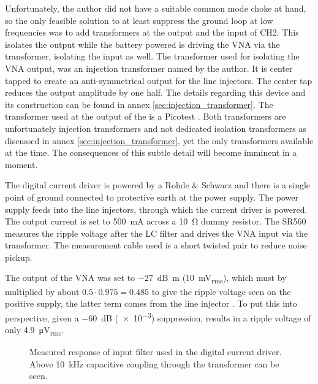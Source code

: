 Unfortunately, the author did not have a suitable common mode choke at hand, so the only feasible solution to at least suppress the ground loop at low frequencies was to add transformers at the output and the input of CH2. This isolates the output while the battery powered  is driving the VNA via the transformer, isolating the input as well. The transformer used for isolating the VNA output, was an injection transformer named  by the author. It is center tapped to create an anti-symmetrical output for the line injectors. The center tap reduces the output amplitude by one half. The details regarding this device and its construction can be found in annex \ref{sec:injection_transformer}. The transformer used at the output of the  is a Picotest . Both transformers are unfortunately injection transformers and not dedicated isolation transformers as discussed in annex \ref{sec:injection_transformer}, yet the only transformers available at the time. The consequences of this subtle detail will become imminent in a moment.

The digital current driver is powered by a Rohde \& Schwarz  and there is a single point of ground connected to protective earth at the power supply. The power supply feeds into the line injectors, through which the current driver is powered. The output current is set to \qty{500}{\mA} across a \qty{10}{\ohm} dummy resistor. The SR560 measures the ripple voltage after the LC filter and drives the VNA input via the transformer. The measurement cable used is a short  twisted pair to reduce noise pickup.

The output of the VNA was set to \qty{-27}{\dB m} (\qty{10}{\mV_{rms}}), which must by multiplied by about $0.5 \cdot 0.975 = 0.485$ to give the ripple voltage seen on the positive supply, the latter term comes from the line injector \cite{line_injector_github}. To put this into perspective, given a \qty{-60}{\dB} (\num{e-3}) suppression, results in a ripple voltage of only \qty{4.9}{\uV_{rms}}.
\begin{figure}[ht]
    \centering
    
    \caption{Measured response of input filter used in the digital current driver. Above \qty{10}{\kHz} capacitive coupling through the transformer can be seen.}
    \label{fig:laser_driver_input_filter_bode}
\end{figure}

